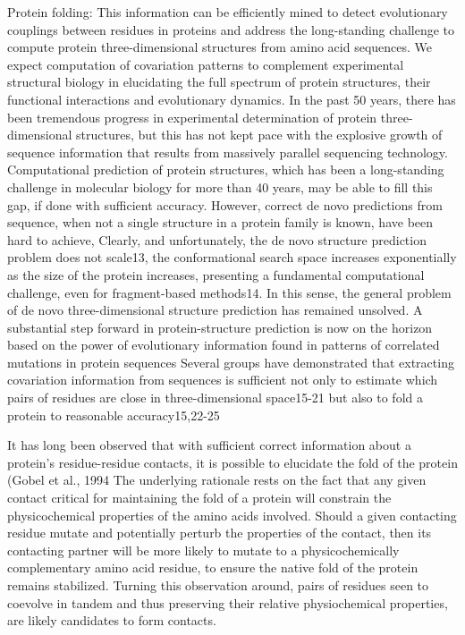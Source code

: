 Protein folding:
	This information can be efficiently mined to detect evolutionary couplings between residues in proteins and address the long-standing challenge to compute protein three-dimensional structures from amino acid sequences. \cite{marks2012protein}
	We expect computation of covariation patterns to complement experimental structural biology in elucidating the full spectrum of protein structures, their functional interactions and evolutionary dynamics. \cite{marks2012protein}
	In the past 50 years, there has been tremendous progress in experimental determination of protein three-dimensional structures, but this has not kept pace with the explosive growth of sequence information that results from massively parallel sequencing technology.  \cite{marks2012protein}
	Computational prediction of protein structures, which has been a long-standing challenge in molecular biology for more than 40 years, may be able to fill this gap, if done with sufficient accuracy.  \cite{marks2012protein}
	However, correct de novo predictions from sequence, when not a single structure in a protein family is known, have been hard to achieve, \cite{marks2012protein}
	Clearly, and unfortunately, the de novo structure prediction problem does not scale13, the conformational search space increases exponentially as the size of the protein increases, presenting a fundamental computational challenge, even for fragment-based methods14. In this sense, the general problem of de novo three-dimensional structure prediction has remained unsolved. \cite{marks2012protein}
	A substantial step forward in protein-structure prediction is now on the horizon based on the power of evolutionary information found in patterns of correlated mutations in protein sequences  \cite{marks2012protein}
	Several groups have demonstrated that extracting covariation information from sequences is sufficient not only to estimate which pairs of residues are close in three-dimensional space15-21 but also to fold a protein to reasonable accuracy15,22-25 \cite{marks2012protein}

It has long been observed that with sufficient correct information about a protein's residue-residue contacts, it is possible to elucidate the fold of the protein (Gobel et al., 1994 \cite{jones2012psicov}
The underlying rationale rests on the fact that any given contact critical for maintaining the fold of a protein will constrain the physicochemical properties of the amino acids involved. Should a given contacting residue mutate and potentially perturb the properties of the contact, then its contacting partner will be more likely to mutate to a physicochemically complementary amino acid residue, to ensure the native fold of the protein remains stabilized. \cite{jones2012psicov}
Turning this observation around, pairs of residues seen to coevolve in tandem and thus preserving their relative physiochemical properties, are likely candidates to form contacts.  \cite{jones2012psicov}

